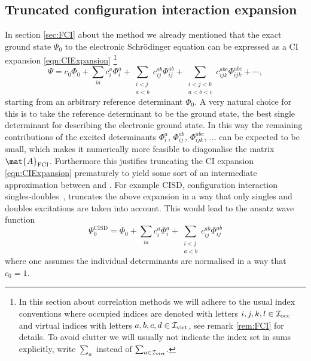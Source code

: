 \subsection{Truncated configuration interaction expansion}
In section \vref{sec:FCI} about the \FCI method we already
mentioned that the exact ground state $\Psi_0$ to the electronic Schrödinger equation
can be expressed as a CI expansion \eqref{eqn:CIExpansion}%
\footnote{
	In this section about correlation methods
	we will adhere to the usual index conventions
	where occupied indices are denoted with letters
	$i,j,k,l \in \mathcal{I}_\text{occ}$ and virtual indices with letters $a,b,c,d \in \mathcal{I}_\text{virt}$,
	see remark \vref{rem:FCI} for details.
	To avoid clutter we will usually not indicate the index set in sums explicitly,
	\eg write $\sum_a$ instead of $\sum_{a \in \mathcal{I}_\text{virt}}$.
}
\[
	\Psi
	= c_0 \Phi_0 + \sum_{ia} c_i^a \Phi_i^a
	+ \sum_{\substack{i<j \\a<b}} c_{ij}^{ab} \Phi_{ij}^{ab}
	+ \sum_{\substack{i<j<k \\ a<b<c}} c_{ijk}^{abc} \Phi_{ijk}^{abc}
	 + \cdots,
\]
starting from an arbitrary reference determinant $\Phi_0$.
A very natural choice for this is to take the reference
determinant to be the \HF ground state,
\ie the best single determinant for describing the electronic ground state.
In this way the
remaining contributions of the excited determinants $\Phi_i^a$,
$\Phi_{ij}^{ab}$, $\Phi_{ijk}^{abc}$, $\ldots$
can be expected to be small,
which makes it numerically more feasible to diagonalise
the \FCI matrix $\mat{A}_\text{FCI}$.
Furthermore this justifies truncating the CI expansion \eqref{eqn:CIExpansion}
prematurely to yield some sort of an intermediate approximation
between \HF and \FCI.
For example CISD, configuration interaction singles-doubles~\cite{Sherrill1999},
truncates the above expansion in a way that only singles and doubles
excitations are taken into account.
This would lead to the ansatz wave function
\[
	\Psi_0^\text{CISD}
	= \Phi_0 + \sum_{ia} c_i^a \Phi_i^a
	+ \sum_{\substack{i<j \\a<b}} c_{ij}^{ab} \Phi_{ij}^{ab}
\]
where one assumes the individual determinants
are normalised in a way that $c_0 = 1$.

